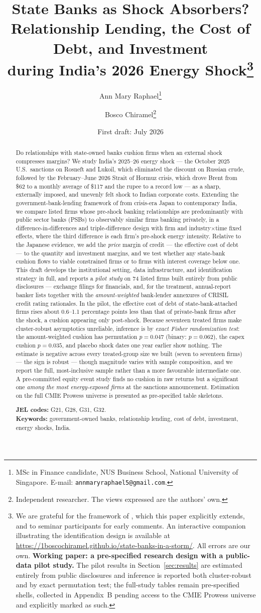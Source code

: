 \documentclass[12pt]{article}
\title{\textbf{State Banks as Shock Absorbers?\\
\large Relationship Lending, the Cost of Debt, and Investment\\
during India's 2026 Energy Shock}\thanks{%
We are grateful for the framework of \citet{lin2015government}, which this paper explicitly
extends, and to seminar participants for early comments. An interactive companion illustrating
the identification design is available at
\url{https://1boscochiramel.github.io/state-banks-in-a-storm/}.
All errors are our own. \textbf{Working paper: a pre-specified research design with a
public-data pilot study.} The pilot results in Section~\ref{sec:results} are estimated
entirely from public disclosures and inference is reported both cluster-robust and by exact
permutation test; the full-study tables remain pre-specified shells, collected in
Appendix~B pending access to the CMIE Prowess universe and explicitly marked as such.}}
\author{Ann Mary Raphael\thanks{MSc in Finance candidate, NUS Business School, National
University of Singapore. E-mail: \texttt{annmaryraphael5@gmail.com}.}
\and
Bosco Chiramel\thanks{Independent researcher. The views expressed are the authors' own.}}
\date{First draft: July 2026}
\begin{document}
\maketitle

\begin{abstract}
\noindent
Do relationships with state-owned banks cushion firms when an external shock compresses
margins? We study India's 2025--26 energy shock --- the October 2025 U.S.\ sanctions on
Rosneft and Lukoil, which eliminated the discount on Russian crude, followed by the
February--June 2026 Strait of Hormuz crisis, which drove Brent from \$62 to a monthly
average of \$117 and the rupee to a record low --- as a sharp, externally imposed, and
unevenly felt shock to Indian corporate costs. Extending the government-bank-lending
framework of \citet{lin2015government} from crisis-era Japan to contemporary India, we
compare listed firms whose pre-shock banking relationships are predominantly with public
sector banks (PSBs) to observably similar firms banking privately, in a difference-in-differences
and triple-difference design with firm and industry$\times$time fixed effects, where the third
difference is each firm's pre-shock energy intensity. Relative to the Japanese evidence, we
add the \emph{price} margin of credit --- the effective cost of debt --- to the quantity and
investment margins, and we test whether any state-bank cushion flows to viable constrained
firms or to firms with interest coverage below one. This draft develops the institutional
setting, data infrastructure, and identification strategy in full, and reports a
\emph{pilot study} on 74 listed firms built entirely from public disclosures --- exchange
filings for financials, and, for the treatment, annual-report banker lists together with the
\emph{amount-weighted} bank-lender annexures of CRISIL credit rating rationales. In the pilot,
the effective cost of debt of state-bank-attached firms rises about 0.6--1.1 percentage points
less than that of private-bank firms after the shock, a cushion appearing only post-shock.
Because seventeen treated firms make cluster-robust asymptotics unreliable, inference is by
\emph{exact Fisher randomization test}: the amount-weighted cushion has permutation
$p=0.047$ (binary: $p=0.062$), the capex cushion $p=0.035$, and placebo shock dates one year
earlier show nothing. The estimate is negative across every treated-group size we built
(seven to seventeen firms) --- the sign is robust --- though magnitude varies with sample
composition, and we report the full, most-inclusive sample rather than a more favourable
intermediate one. A pre-committed equity event study finds no cushion in raw returns but a
significant one \emph{among the most energy-exposed firms} at the sanctions announcement.
Estimation on the full CMIE Prowess universe is presented as pre-specified table skeletons.
\medskip

\noindent\textbf{JEL codes:} G21, G28, G31, G32.\\
\textbf{Keywords:} government-owned banks, relationship lending, cost of debt, investment,
energy shocks, India.
\end{abstract}
\end{document}
